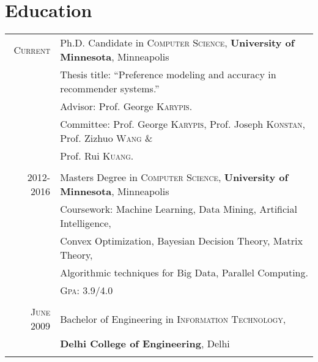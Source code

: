 \documentclass[a4paper,10pt]{article}
\begin{document}
\section{Education}
\begin{tabular}{r|l}	
 \textsc{Current}  & Ph.D. Candidate in \textsc{Computer Science},
  \textbf{University of Minnesota}, Minneapolis\\
 & Thesis title: ``Preference modeling and accuracy in
  recommender systems.''\\
  & \small Advisor: Prof. George \textsc{Karypis}. \\
  & \small Committee: Prof. George \textsc{Karypis}, Prof. Joseph
  \textsc{Konstan},  Prof. Zizhuo \textsc{Wang} \& \\
  & \small Prof. Rui \textsc{Kuang}. \\
  \multicolumn{2}{c}{}\\

  \textsc{2012-2016} & Masters Degree in \textsc{Computer Science},
  \textbf{University of Minnesota}, Minneapolis \\
                     &Coursework: Machine Learning, Data Mining, Artificial
  Intelligence,  \\
                   &Convex Optimization, Bayesian Decision Theory, Matrix
  Theory, \\ 
  &Algorithmic techniques for Big Data, Parallel Computing. \\
                     &\normalsize \textsc{Gpa}: 3.9/4.0 \\
                   \multicolumn{2}{c}{}\\ %

   
   \textsc{June} 2009& Bachelor of Engineering in \textsc{Information
      Technology}, \\
      &\textbf{Delhi College of Engineering}, Delhi\\
\multicolumn{2}{c}{}\\
\end{tabular}
\end{document}
